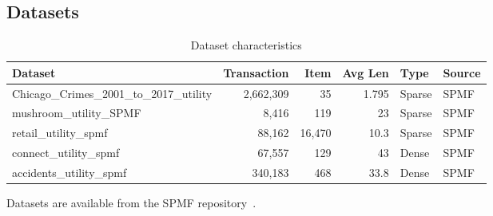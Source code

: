 \subsection{Datasets}

\begin{table}[H]
\caption{Dataset characteristics}\label{tab:datasets}
\centering
\begin{tabular}{@{}lrrrll@{}}
\toprule
\textbf{Dataset} & \textbf{Transaction} & \textbf{Item} & \textbf{Avg Len} & \textbf{Type} & \textbf{Source} \\
\midrule

Chicago\_Crimes\_2001\_to\_2017\_utility & 2,662,309 & 35 & 1.795 & Sparse & SPMF \\
mushroom\_utility\_SPMF & 8,416 & 119 & 23 & Sparse & SPMF \\
retail\_utility\_spmf & 88,162 & 16,470 & 10.3 & Sparse & SPMF \\
connect\_utility\_spmf & 	67,557 & 129 & 43 & Dense & SPMF \\

accidents\_utility\_spmf & 340,183 & 	468 & 33.8 & Dense & SPMF \\
\bottomrule
\end{tabular}
\end{table}

Datasets are available from the SPMF repository~\cite{ref_spmf}.